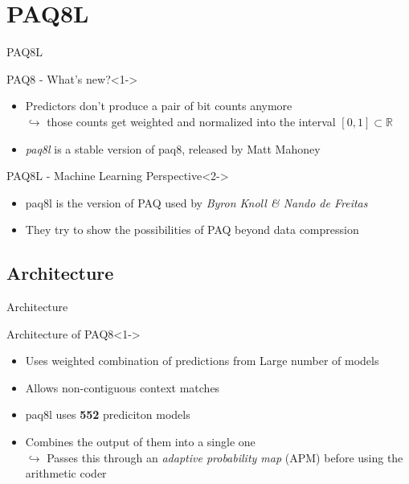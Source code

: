 \documentclass[11pt,usenames,dvipsnames]{beamer}
\begin{document}
\section{PAQ8L}
\begin{frame}{PAQ8L}
	\begin{exampleblock}{PAQ8 - What's new?}<1->
		\begin{itemize}
			\item Predictors don't produce a pair of bit counts anymore\\
			$\hookrightarrow$ those counts get weighted and normalized into the interval $[0,1]\subset\mathbb{R}$
			\item \textit{paq8l} is a stable version of paq8, released by Matt Mahoney
		\end{itemize}
	\end{exampleblock}
	
		\begin{alertblock}{PAQ8L - Machine Learning Perspective}<2->
		\begin{itemize}
			\item paq8l is the version of PAQ used by \textit{Byron Knoll \& Nando de Freitas}
			\item They try to show the possibilities of PAQ beyond data compression
		\end{itemize}
	\end{alertblock}
\end{frame}

\subsection{Architecture}
\begin{frame}{Architecture}


	\begin{exampleblock}{Architecture of PAQ8}<1->
		\begin{itemize}
			\item Uses weighted combination of predictions from Large number of models
			\item Allows non-contiguous context matches
			\item paq8l uses \textbf{552} prediciton models
			\item Combines the output of them into a single one\\
			$\hookrightarrow$ Passes this through an \textit{adaptive probability map} (APM) before using the arithmetic coder
		\end{itemize}
	\end{exampleblock}
	\hfill
	

	

\end{frame}
\end{document}
